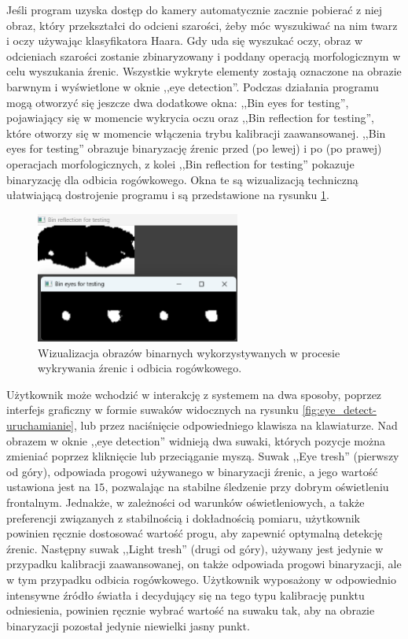 \documentclass[a4paper,twoside,12pt]{book}
\begin{document}
Jeśli program uzyska dostęp do kamery automatycznie zacznie pobierać z niej obraz, który przekształci do odcieni szarości, żeby móc wyszukiwać na nim twarz i oczy używając klasyfikatora Haara. Gdy uda się wyszukać oczy, obraz w odcieniach szarości zostanie zbinaryzowany i poddany operacją morfologicznym w celu wyszukania źrenic. Wszystkie wykryte elementy zostają oznaczone na obrazie barwnym i wyświetlone w oknie ,,eye detection''. Podczas działania programu mogą otworzyć się jeszcze dwa dodatkowe okna: ,,Bin eyes for testing'', pojawiający się w momencie wykrycia oczu oraz ,,Bin reflection for testing'', które otworzy się w momencie włączenia trybu kalibracji zaawansowanej. ,,Bin eyes for testing'' obrazuje binaryzację źrenic przed (po lewej) i po (po prawej) operacjach morfologicznych, z kolei ,,Bin reflection for testing'' pokazuje binaryzację dla odbicia rogówkowego. Okna te są wizualizacją techniczną ułatwiającą dostrojenie programu i są przedstawione na rysunku \ref{fig:eye_detect-okna-bin}.

\begin{figure}[htbp]
	\centering
	\includegraphics[width=0.6\textwidth]{pic/obsługa/okna binarne.png}
	\caption{Wizualizacja obrazów binarnych wykorzystywanych w procesie wykrywania źrenic i odbicia rogówkowego.}
	\label{fig:eye_detect-okna-bin}
\end{figure}

Użytkownik może wchodzić w interakcję z systemem na dwa sposoby, poprzez interfejs graficzny w formie suwaków widocznych na rysunku \ref{fig:eye_detect-uruchamianie}, lub przez naciśnięcie odpowiedniego klawisza na klawiaturze. Nad obrazem w oknie ,,eye detection'' widnieją dwa suwaki, których pozycje można zmieniać poprzez kliknięcie lub przeciąganie myszą. Suwak ,,Eye tresh'' (pierwszy od góry), odpowiada progowi używanego w binaryzacji źrenic, a jego wartość ustawiona jest na $15$, pozwalając na stabilne śledzenie przy dobrym oświetleniu frontalnym. Jednakże, w zależności od warunków oświetleniowych, a także preferencji związanych z stabilnością i dokładnością pomiaru, użytkownik powinien ręcznie dostosować wartość progu, aby zapewnić optymalną detekcję źrenic. Następny suwak ,,Light tresh'' (drugi od góry), używany jest jedynie w przypadku kalibracji zaawansowanej, on także odpowiada progowi binaryzacji, ale w tym przypadku odbicia rogówkowego. Użytkownik wyposażony w odpowiednio intensywne źródło światła i decydujący się na tego typu kalibrację punktu odniesienia, powinien ręcznie wybrać wartość na suwaku tak, aby na obrazie binaryzacji pozostał jedynie niewielki jasny punkt. 
\end{document}
